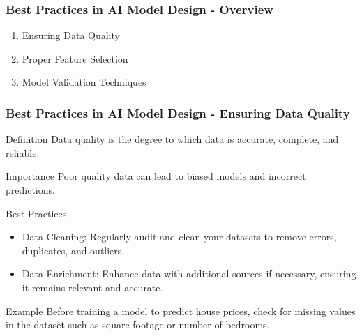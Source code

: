 \documentclass[aspectratio=169]{beamer}
\begin{document}
\begin{frame}[fragile]
    \frametitle{Best Practices in AI Model Design - Overview}
    \begin{enumerate}
        \item Ensuring Data Quality
        \item Proper Feature Selection
        \item Model Validation Techniques
    \end{enumerate}
\end{frame}

\begin{frame}[fragile]
    \frametitle{Best Practices in AI Model Design - Ensuring Data Quality}
    \begin{block}{Definition}
        Data quality is the degree to which data is accurate, complete, and reliable.
    \end{block}

    \begin{block}{Importance}
        Poor quality data can lead to biased models and incorrect predictions.
    \end{block}

    \begin{block}{Best Practices}
        \begin{itemize}
            \item Data Cleaning: Regularly audit and clean your datasets to remove errors, duplicates, and outliers.
            \item Data Enrichment: Enhance data with additional sources if necessary, ensuring it remains relevant and accurate.
        \end{itemize}
    \end{block}

    \begin{exampleblock}{Example}
        Before training a model to predict house prices, check for missing values in the dataset such as square footage or number of bedrooms.
    \end{exampleblock}
\end{frame}
\end{document}
